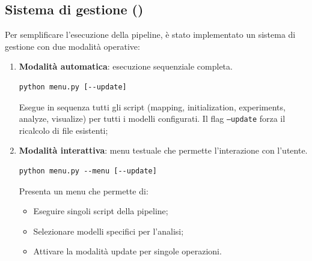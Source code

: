 \documentclass[../relazione.tex]{subfiles}
\begin{document}
\subsection{Sistema di gestione (\protect{})}
Per semplificare l'esecuzione della pipeline, è stato implementato un sistema di gestione con due modalità operative:

\begin{enumerate}
    \item \textbf{Modalità automatica}: esecuzione sequenziale completa.
    \begin{lstlisting}
python menu.py [--update]
    \end{lstlisting}
    Esegue in sequenza tutti gli script (mapping, initialization, experiments, analyze, visualize) per tutti i modelli configurati. Il flag \texttt{--update} forza il ricalcolo di file esistenti;
    
    \item \textbf{Modalità interattiva}: menu testuale che permette l'interazione con l'utente.
    \begin{lstlisting}
python menu.py --menu [--update]
    \end{lstlisting}
    Presenta un menu che permette di:
    \begin{itemize}
        \item Eseguire singoli script della pipeline;
        \item Selezionare modelli specifici per l'analisi;
        \item Attivare la modalità update per singole operazioni.
    \end{itemize}
\end{enumerate}
\end{document}
